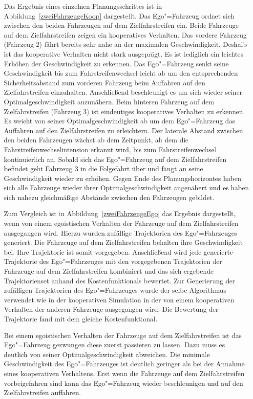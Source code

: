 Das Ergebnis eines einzelnen Planungsschrittes ist in Abbildung~\ref{zweiFahrzeugeKoop} dargestellt.
Das Ego"=Fahrzeug ordnet sich zwischen den beiden Fahrzeugen auf dem Zielfahrstreifen ein.
Beide Fahrzeuge auf dem Zielfahrstreifen zeigen ein kooperatives Verhalten.
Das vordere Fahrzeug (Fahrzeug 2) f\"ahrt bereits sehr nahe an der maximalen Geschwindigkeit.
Deshalb ist das kooperative Verhalten nicht stark ausgepr\"agt.
Es ist lediglich ein leichtes Erh\"ohen der Geschwindigkeit zu erkennen.
Das Ego"=Fahrzeug senkt seine Geschwindigkeit bis zum Fahrstreifenwechsel leicht ab um den entsprechenden Sicherheitsabstand zum vorderen Fahrzeug beim Auffahren auf den Zielfahrstreifen einzuhalten.
Anschlie{\ss}end beschleunigt es um sich wieder seiner Optimalgeschwindigkeit anzun\"ahern.
Beim hinteren Fahrzeug auf dem Zielfahrstreifen (Fahrzeug 3) ist eindeutiges kooperatives Verhalten zu erkennen.
Es weicht von seiner Optimalgeschwindigkeit ab um dem Ego"=Fahrzeug das Auffahren auf den Zielfahrstreifen zu erleichtern.
Der laterale Abstand zwischen den beiden Fahrzeugen w\"achst ab dem Zeitpunkt, ab dem die Fahrstreifenwechselintension erkannt wird, bis zum Fahrstreifenwechsel kontinuierlich an.
Sobald sich das Ego"=Fahrzeug auf dem Zielfahrstreifen befindet geht Fahrzeug 3 in die Folgefahrt \"uber und f\"angt an seine Geschwindigkeit wieder zu erh\"ohen.
Gegen Ende des Planungshorizontes haben sich alle Fahrzeuge wieder ihrer Optimalgeschwindigkeit angen\"ahert und es haben sich nahezu gleichm\"a{\ss}ige Abst\"ande zwischen den Fahrzeugen gebildet.

Zum Vergleich ist in Abbildung~\ref{zweiFahrzeugeEgo} das Ergebnis dargestellt, wenn von einem egoistischen Verhalten der Fahrzeuge auf dem Zielfahrstreifen ausgegangen wird.
Hierzu wurden zuf\"allige Trajektorien des Ego"=Fahrzeuges generiert.
Die Fahrzeuge auf dem Zielfahrstreifen behalten ihre Geschwindigkeit bei.
Ihre Trajektorie ist somit vorgegeben.
Anschlie{\ss}end wird jede generierte Trajektorie des Ego"=Fahrzeuges mit den vorgegebenen Trajektorien der Fahrzeuge auf dem Zielfahrstreifen kombiniert und das sich ergebende Trajektorienset anhand des Kostenfunktionals bewertet.
Zur Generierung der zuf\"alligen Trajektorien des Ego"=Fahrzeuges wurde der selbe Algorithmus verwendet wie in der kooperativen Simulation in der von einem kooperativen Verhalten der anderen Fahrzeuge ausgegangen wird. 
Die Bewertung der Trajektorie fand mit dem gleiche Kostenfunktional.

Bei einem egoistischen Verhalten der Fahrzeuge auf dem Zielfahrstreifen ist das Ego"=Fahrzeug gezwungen diese zuerst passieren zu lassen.
Dazu muss es deutlich von seiner Optimalgeschwindigkeit abweichen.
Die minimale Geschwindigkeit des Ego"=Fahrzeuges ist deutlich geringer als bei der Annahme eines kooperativen Verhaltens.
Erst wenn die Fahrzeuge auf dem Zielfahrstreifen vorbeigefahren sind kann das Ego"=Fahrzeug wieder beschleunigen und auf den Zielfahrstreifen auffahren.

